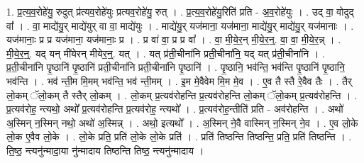 \documentclass[17pt]{extarticle}
\begin{document}
1. प्र॒त्य॒व॒रोहे॑यु॒ रुदुत् प्र॑त्यव॒रोहे॑युः प्रत्यव॒रोहे॑यु॒ रुत् । . प्र॒त्य॒व॒रोहे॑यु॒रिति॑ प्रति - अ॒व॒रोहे॑युः । . उद् वा॒ वोदुद् वा᳚ । . वा॒ माद्ये॑यु॒र् माद्ये॑युर् वा वा॒ माद्ये॑युः । . माद्ये॑यु॒र् यज॑माना॒ यज॑माना॒ माद्ये॑यु॒र् माद्ये॑यु॒र् यज॑मानाः । . यज॑मानाः॒ प्र प्र यज॑माना॒ यज॑मानाः॒ प्र । . प्र वा॑ वा॒ प्र प्र वा᳚ । . वा॒ मी॒ये॒र॒न् मी॒ये॒र॒न्॒. वा॒ वा॒ मी॒ये॒र॒न्न् । . मी॒ये॒र॒न्॒. यद् यन् मी॑येरन् मीयेर॒न्॒. यत् । . यत् प्र॑ती॒चीना॑नि प्रती॒चीना॑नि॒ यद् यत् प्र॑ती॒चीना॑नि । . प्र॒ती॒चीना॑नि पृ॒ष्ठानि॑ पृ॒ष्ठानि॑ प्रती॒चीना॑नि प्रती॒चीना॑नि पृ॒ष्ठानि॑ । . पृ॒ष्ठानि॒ भव॑न्ति॒ भव॑न्ति पृ॒ष्ठानि॑ पृ॒ष्ठानि॒ भव॑न्ति । . भव॑ न्ती॒म मि॒मम् भव॑न्ति॒ भव॑ न्ती॒मम् । . इ॒म मे॒वैवेम मि॒म मे॒व । . ए॒व तै स्तै रे॒वैव तैः । . तैर् लो॒कम् ॅलो॒कम् तै स्तैर् लो॒कम् । . लो॒कम् प्र॒त्यव॑रोहन्ति प्र॒त्यव॑रोहन्ति लो॒कम् ॅलो॒कम् प्र॒त्यव॑रोहन्ति । . प्र॒त्यव॑रोह॒ न्त्यथो॒ अथो᳚ प्र॒त्यव॑रोहन्ति प्र॒त्यव॑रोह॒ न्त्यथो᳚ । . प्र॒त्यव॑रोह॒न्तीति॑ प्रति - अव॑रोहन्ति । . अथो॑ अ॒स्मिन् न॒स्मिन् नथो॒ अथो॑ अ॒स्मिन्न् । . अथो॒ इत्यथो᳚ । . अ॒स्मिन् ने॒वै वास्मिन् न॒स्मिन् ने॒व । . ए॒व लो॒के लो॒क ए॒वैव लो॒के । . लो॒के प्रति॒ प्रति॑ लो॒के लो॒के प्रति॑ । . प्रति॑ तिष्ठन्ति तिष्ठन्ति॒ प्रति॒ प्रति॑ तिष्ठन्ति । . ति॒ष्ठ॒ न्त्यनु॑न्मादा॒या नु॑न्मादाय तिष्ठन्ति तिष्ठ॒ न्त्यनु॑न्मादाय । \newline
\end{document}
